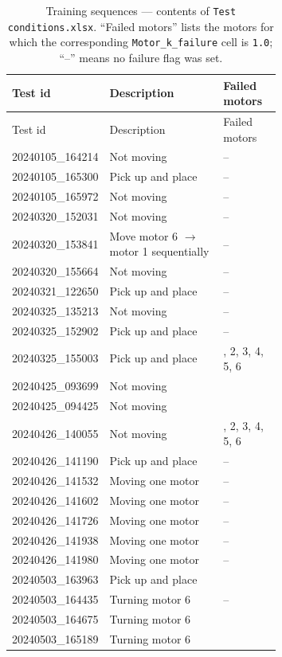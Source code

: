 \documentclass[11pt,a4paper]{article}
\begin{document}
\begin{longtable}{@{}l>{\raggedright\arraybackslash}p{0.45\linewidth}>{\raggedright\arraybackslash}p{0.22\linewidth}@{}}
\caption{Training sequences --- contents of \texttt{Test conditions.xlsx}.
``Failed motors'' lists the motors for which the corresponding
\texttt{Motor\_k\_failure} cell is \texttt{1.0}; ``--'' means no failure
flag was set.}\label{tab:train-conditions}\\
\toprule
Test id & Description & Failed motors \\
\midrule
\endfirsthead
\toprule
Test id & Description & Failed motors \\
\midrule
\endhead
20240105\_164214 & Not moving                            & -- \\
20240105\_165300 & Pick up and place                     & -- \\
20240105\_165972 & Not moving                            & -- \\
20240320\_152031 & Not moving                            & -- \\
20240320\_153841 & Move motor 6 $\to$ motor 1 sequentially & -- \\
20240320\_155664 & Not moving                            & -- \\
20240321\_122650 & Pick up and place                     & -- \\
20240325\_135213 & Not moving                            & -- \\
20240325\_152902 & Pick up and place                     & -- \\
20240325\_155003 & Pick up and place                     & 1, 2, 3, 4, 5, 6 \\
20240425\_093699 & Not moving                            & 6 \\
20240425\_094425 & Not moving                            & 6 \\
20240426\_140055 & Not moving                            & 1, 2, 3, 4, 5, 6 \\
20240426\_141190 & Pick up and place                     & -- \\
20240426\_141532 & Moving one motor                      & -- \\
20240426\_141602 & Moving one motor                      & -- \\
20240426\_141726 & Moving one motor                      & -- \\
20240426\_141938 & Moving one motor                      & -- \\
20240426\_141980 & Moving one motor                      & -- \\
20240503\_163963 & Pick up and place                     & 6 \\
20240503\_164435 & Turning motor 6                       & -- \\
20240503\_164675 & Turning motor 6                       & 6 \\
20240503\_165189 & Turning motor 6                       & 6 \\
\bottomrule
\end{longtable}
\end{document}
